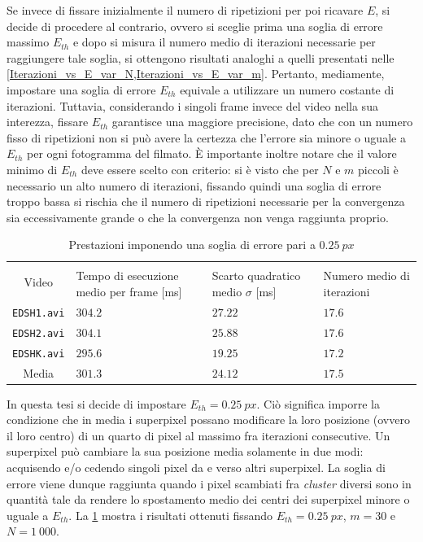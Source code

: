 \documentclass[12pt,a4paper,oneside]{article}
\begin{document}
Se invece di fissare inizialmente il numero di ripetizioni per poi ricavare $E$, si decide di procedere al contrario, ovvero si sceglie prima una soglia di errore massimo $E_{th}$ e dopo si misura il numero medio di iterazioni necessarie per raggiungere tale soglia, si ottengono risultati analoghi a quelli presentati nelle \cref{Iterazioni_vs_E_var_N,Iterazioni_vs_E_var_m}. Pertanto, mediamente, impostare una soglia di errore $E_{th}$ equivale a utilizzare un numero costante di iterazioni. Tuttavia, considerando i singoli frame invece del video nella sua interezza, fissare $E_{th}$ garantisce una maggiore precisione, dato che con un numero fisso di ripetizioni non si può avere la certezza che l'errore sia minore o uguale a $E_{th}$ per ogni fotogramma del filmato. È importante inoltre notare che il valore minimo di $E_{th}$ deve essere scelto con criterio: si è visto che per $N$ e $m$ piccoli è necessario un alto numero di iterazioni, fissando quindi una soglia di errore troppo bassa si rischia che il numero di ripetizioni necessarie per la convergenza sia eccessivamente grande o che la convergenza non venga raggiunta proprio.  

\begin{table}[!htb]
	\renewcommand{\arraystretch}{1.3}
	\centering
	\begin{tabular}{|c||>{\centering\arraybackslash}m{}|>{\centering\arraybackslash}m{}|>{\centering\arraybackslash}m{}|}
	    \hline
		\multirow{2}{*}{\vspace{-6ex}Video}
		& \multicolumn{3}{c|}{VideoSLIC}\\\cline{2-4}
		& Tempo di esecuzione medio per frame [ms] & Scarto quadratico medio $\sigma$ [ms] & Numero medio di iterazioni\\
		\hline\hline
		\texttt{EDSH1.avi} & $304.2$ & $27.22$ & $17.6$ \\\hline
		\texttt{EDSH2.avi} & $304.1$ & $25.88$ & $17.6$ \\\hline
		\texttt{EDSHK.avi} & $295.6$ & $19.25$ & $17.2$ \\\hline\hline
		Media              & $301.3$ & $24.12$ & $17.5$ \\\hline
	\end{tabular}
	\caption{Prestazioni imponendo una soglia di errore pari a $0.25~px$}
	\label{EDSH_videos_error_no_memory}
\end{table}
\noindent In questa tesi si decide di impostare $E_{th} = 0.25~px$. Ciò significa imporre la condizione che in media i superpixel possano modificare la loro posizione (ovvero il loro centro) di un quarto di pixel al massimo fra iterazioni consecutive. Un superpixel può cambiare la sua posizione media solamente in due modi: acquisendo e/o cedendo singoli pixel da e verso altri superpixel. La soglia di errore viene dunque raggiunta quando i pixel scambiati fra \textit{cluster} diversi sono in quantità tale da rendere lo spostamento medio dei centri dei superpixel minore o uguale a $E_{th}$. La \cref{EDSH_videos_error_no_memory} mostra i risultati ottenuti fissando $E_{th} = 0.25~px$, $m = 30$ e $N = 1~000$.
\end{document}
